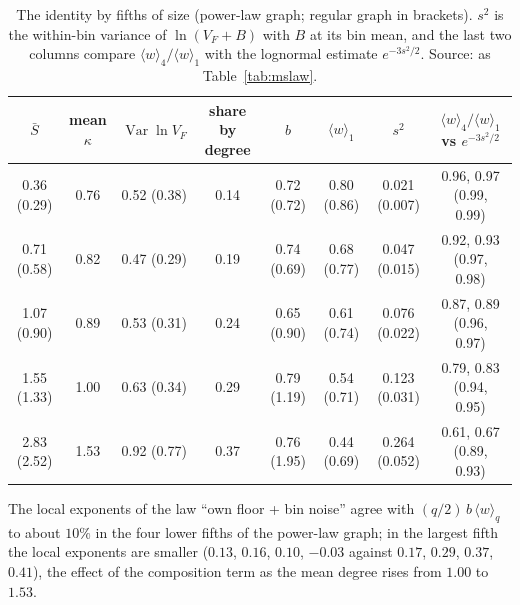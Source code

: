 \documentclass[pre,twocolumn,superscriptaddress,nofootinbib]{revtex4-2}
\newcommand{\Var}{\operatorname{Var}}
\newcommand{\Sb}{\bar S}
\begin{document}
\begin{table}[t]
\caption{The identity by fifths of size (power-law graph; regular graph in brackets).  $s^2$ is the
within-bin variance of $\ln(V_F+B)$ with $B$ at its bin mean, and the last two columns compare
$\langle w\rangle_4/\langle w\rangle_1$ with the lognormal estimate $e^{-3s^2/2}$.  Source: as Table~\ref{tab:mslaw}.}
\label{tab:fifths}
\begin{ruledtabular}
\begin{tabular}{cccccccc}
$\Sb$ & mean $\kappa$ & $\Var\ln V_F$ & share by degree & $b$ & $\langle w\rangle_1$ & $s^2$ & $\langle w\rangle_4/\langle w\rangle_1$ vs $e^{-3s^2/2}$\\
\hline
0.36 (0.29) & 0.76 & 0.52 (0.38) & 0.14 & 0.72 (0.72) & 0.80 (0.86) & 0.021 (0.007) & 0.96, 0.97 (0.99, 0.99)\\
0.71 (0.58) & 0.82 & 0.47 (0.29) & 0.19 & 0.74 (0.69) & 0.68 (0.77) & 0.047 (0.015) & 0.92, 0.93 (0.97, 0.98)\\
1.07 (0.90) & 0.89 & 0.53 (0.31) & 0.24 & 0.65 (0.90) & 0.61 (0.74) & 0.076 (0.022) & 0.87, 0.89 (0.96, 0.97)\\
1.55 (1.33) & 1.00 & 0.63 (0.34) & 0.29 & 0.79 (1.19) & 0.54 (0.71) & 0.123 (0.031) & 0.79, 0.83 (0.94, 0.95)\\
2.83 (2.52) & 1.53 & 0.92 (0.77) & 0.37 & 0.76 (1.95) & 0.44 (0.69) & 0.264 (0.052) & 0.61, 0.67 (0.89, 0.93)\\
\end{tabular}
\end{ruledtabular}
\end{table}

The local exponents of the law ``own floor + bin noise'' agree with $(q/2)\,b\,\langle w\rangle_q$ to about $10\%$
in the four lower fifths of the power-law graph; in the largest fifth the local exponents are smaller
($0.13$, $0.16$, $0.10$, $-0.03$ against $0.17$, $0.29$, $0.37$, $0.41$), the effect of the composition term as
the mean degree rises from $1.00$ to $1.53$.
\end{document}
